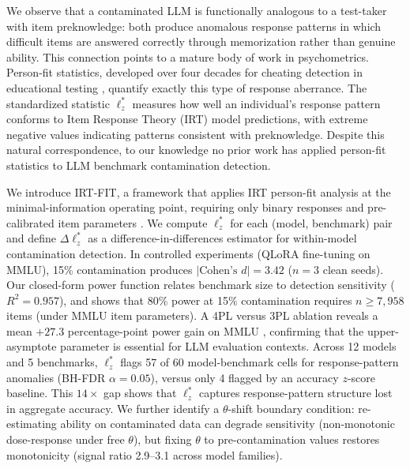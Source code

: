 We observe that a contaminated LLM is functionally analogous to a test-taker with item preknowledge: both produce anomalous response patterns in which difficult items are answered correctly through memorization rather than genuine ability.
This connection points to a mature body of work in psychometrics.
Person-fit statistics, developed over four decades for cheating detection in educational testing \citep{drasgow1985, meijer2001, karabatsos2003, sinharay2017}, quantify exactly this type of response aberrance.
The standardized statistic $\ell_z^*$ \citep{snijders2001} measures how well an individual's response pattern conforms to Item Response Theory (IRT) model predictions, with extreme negative values indicating patterns consistent with preknowledge.
Despite this natural correspondence, to our knowledge no prior work has applied person-fit statistics to LLM benchmark contamination detection.

We introduce IRT-FIT, a framework that applies IRT person-fit analysis at the minimal-information operating point, requiring only binary responses and pre-calibrated item parameters \citep{psnirt2026}.
We compute $\ell_z^*$ for each (model, benchmark) pair and define $\Delta\ell_z^*$ as a difference-in-differences estimator for within-model contamination detection.
In controlled experiments (QLoRA fine-tuning on MMLU), 15\% contamination produces $|\text{Cohen's } d| = 3.42$ ($n{=}3$ clean seeds).
Our closed-form power function relates benchmark size to detection sensitivity ($R^2 = 0.957$), and shows that 80\% power at 15\% contamination requires $n \geq 7{,}958$ items (under MMLU item parameters).
A 4PL versus 3PL ablation reveals a mean $+27.3$ percentage-point power gain on MMLU \citep{hendrycks2021mmlu}, confirming that the upper-asymptote parameter is essential for LLM evaluation contexts.
Across 12 models and 5 benchmarks, $\ell_z^*$ flags 57 of 60 model-benchmark cells for response-pattern anomalies (BH-FDR $\alpha{=}0.05$), versus only 4 flagged by an accuracy $z$-score baseline.
This $14\times$ gap shows that $\ell_z^*$ captures response-pattern structure lost in aggregate accuracy.
We further identify a $\theta$-shift boundary condition: re-estimating ability on contaminated data can degrade sensitivity (non-monotonic dose-response under free $\theta$), but fixing $\theta$ to pre-contamination values restores monotonicity (signal ratio 2.9--3.1 across model families).

